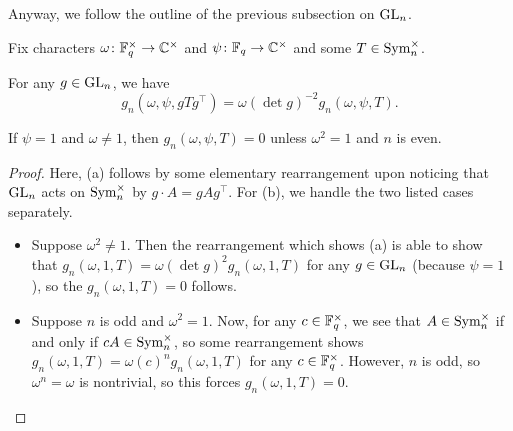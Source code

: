 Anyway, we follow the outline of the previous subsection on $\mathrm{GL}_n$.
\begin{lemma} \label{lem:gsum-sym-basic}
    Fix characters $\omega\colon\mathbb F_q^\times\to\mathbb C^\times$ and $\psi\colon\mathbb F_q\to\mathbb C^\times$ and some $T\in\operatorname{Sym}_n^\times$.
    \begin{listalph}
        \item For any $g\in\mathrm{GL}_n$, we have
        \[g_n(\omega,\psi,gTg^\intercal)=\omega(\det g)^{-2}g_n(\omega,\psi,T).\]
        \item If $\psi=1$ and $\omega\ne1$, then $g_n(\omega,\psi,T)=0$ unless $\omega^2=1$ and $n$ is even.
    \end{listalph}
\end{lemma}
\begin{proof}
    Here, (a) follows by some elementary rearrangement upon noticing that $\operatorname{GL}_n$ acts on $\operatorname{Sym}_n^\times$ by $g\cdot A=gAg^\intercal$. For (b), we handle the two listed cases separately.
    \begin{itemize}
        \item Suppose $\omega^2\ne1$. Then the rearrangement which shows (a) is able to show that $g_n(\omega,1,T)=\omega(\det g)^2g_n(\omega,1,T)$ for any $g\in\mathrm{GL}_n$ (because $\psi=1$), so the $g_n(\omega,1,T)=0$ follows.
        \item Suppose $n$ is odd and $\omega^2=1$. Now, for any $c\in\mathbb F_q^\times$, we see that $A\in\operatorname{Sym}_n^\times$ if and only if $cA\in\operatorname{Sym}_n^\times$, so some rearrangement shows $g_n(\omega,1,T)=\omega(c)^ng_n(\omega,1,T)$ for any $c\in\mathbb F_q^\times$. However, $n$ is odd, so $\omega^n=\omega$ is nontrivial, so this forces $g_n(\omega,1,T)=0$.

\end{itemize}
\end{proof}
